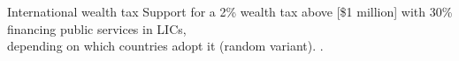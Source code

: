 \documentclass[aspectratio=169,xcolor=dvipsnames, 11pt,mathserif]{beamer}
\begin{document}
\begin{frame}{International wealth tax}
\centering Support for a 2\% wealth tax above [\$1 million] with 30\% financing public services in LICs,\\depending on which countries adopt it (random variant).
.
\end{frame}

\end{document}
